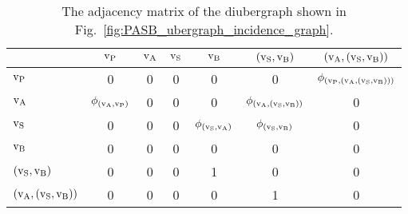 \begin{table}[!htb]\label{tab:adjacency_matrix_PASB}
\caption{The adjacency matrix of the diubergraph shown in Fig.~\ref{fig:PASB_ubergraph_incidence_graph}.}
\begin{tabular}{|l|cccccc|}
\hline
{} &  $\text{v}_\text{P}$ &  $\text{v}_\text{A}$ &  $\text{v}_\text{S}$ &  $\text{v}_\text{B}$ &       {\scriptsize$(\text{v}_\text{S},\text{v}_\text{B})$} &       {\scriptsize$(\text{v}_\text{A},(\text{v}_\text{S},\text{v}_\text{B}))$} \\       
\hline
$\text{v}_\text{P}$             &  {\scriptsize 0} &  {\scriptsize 0} &  {\scriptsize 0} &      {\scriptsize 0} & {\scriptsize 0} &               $\phi_{(\text{v}_\text{P},(\text{v}_\text{A},(\text{v}_\text{S},\text{v}_\text{B})))}$   \\
$\text{v}_\text{A}$             &  $\phi_{(\text{v}_\text{A},\text{v}_\text{P})}$ &  {\scriptsize 0} &  {\scriptsize 0}  &           {\scriptsize 0} &     $\phi_{(\text{v}_\text{A},(\text{v}_\text{S},\text{v}_\text{B}))}$ &      {\scriptsize 0}    \\                  
$\text{v}_\text{S}$             &  {\scriptsize 0} &  {\scriptsize 0} &  {\scriptsize 0}  &  $\phi_{(\text{v}_\text{S},\text{v}_\text{A})}$ &  $\phi_{(\text{v}_\text{S},\text{v}_\text{B})}$ &               {\scriptsize 0} \\                 
$\text{v}_\text{B}$             &  {\scriptsize 0} &  {\scriptsize 0} &  {\scriptsize 0}  &           {\scriptsize 0} &           {\scriptsize 0} &               {\scriptsize 0} \\                  
{\scriptsize$(\text{v}_\text{S},\text{v}_\text{B})$}         &  {\scriptsize 0} &  {\scriptsize 0} &  {\scriptsize 0} &  1 &             {\scriptsize 0} &               {\scriptsize 0} \\                  
{\scriptsize$(\text{v}_\text{A},(\text{v}_\text{S},\text{v}_\text{B}))$}     &  {\scriptsize 0} &  {\scriptsize 0} &  {\scriptsize 0} &  {\scriptsize 0} &           1 &               {\scriptsize 0} \\                  

\hline
\end{tabular}
\end{table}
